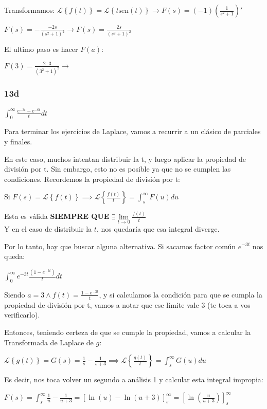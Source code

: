 \documentclass[11pt]{article}
\def\sen{\mathrm{sen}}
\newcommand{\lapl}[1]{\mathscr{L} \left\lbrace {#1} \right\rbrace}
\begin{document}
	Transformamos: $\displaystyle \lapl{f(t)}=\lapl{t\sen(t)} \rightarrow F(s)=(-1)\left(\frac{1}{s^2+1}\right)'$
	
	$\displaystyle F(s)=-\frac{-2s}{(s^2+1)^2}\rightarrow F(s)=\frac{2s}{(s^2+1)^2}$
	
	El ultimo paso es hacer $F(a)$:
	
	$\displaystyle F(3)=\frac{2\cdot3}{(3^2+1)^2} \rightarrow $ 
	
	\subsubsection{13d}	
	$\displaystyle \int_{0}^{\infty}\frac{e^{-3t}-e^{-6t}}{t}dt$
	
	Para terminar los ejercicios de Laplace, vamos a recurrir a un clásico de parciales y finales.
	
	En este caso, muchos intentan distribuir la t, y luego aplicar la propiedad de división por t. Sin embargo, esto no es posible ya que no se cumplen las condiciones. Recordemos la propiedad de división por t:
	
	Si $\displaystyle F(s)=\lapl{f(t)} \implies \lapl{\frac{f(t)}{t}}=\int_{s}^{\infty}F(u)du$
	
	Esta es válida \textbf{SIEMPRE QUE } $\displaystyle \exists \lim\limits_{t\rightarrow0}\frac{f(t)}{t}$\\
	Y en el caso de distribuir la $t$, nos quedaría que esa integral diverge.
	
	Por lo tanto, hay que buscar alguna alternativa. Si sacamos factor común $e^{-3t}$ nos queda:
	
	$\displaystyle \int_{0}^{\infty}e^{-3t}\frac{(1-e^{-3t})}{t}dt$
	
	Siendo $\displaystyle a=3 \wedge f(t)=\frac{1-e^{-3t}}{t}$, y si calculamos la condición para que se cumpla la propiedad de división por t, vamos a notar que ese límite vale 3 (te toca a vos verificarlo).
	
	Entonces, teniendo certeza de que se cumple la propiedad, vamos a calcular la Transformada de Laplace de $g$:
	
	$\displaystyle \lapl{g(t)}=G(s)=\frac{1}{s}-\frac{1}{s+3} \implies \lapl{\frac{g(t)}{t}}=\int_{s}^{\infty}G(u)du$
	
	Es decir, nos toca volver un segundo a análisis 1 y calcular esta integral impropia:
	
	$\displaystyle F(s)=\int_{s}^{\infty} \frac{1}{u}-\frac{1}{u+3}=\left[\ln(u)-\ln(u+3)\right]_{s}^{\infty}=\left[\ln\left(\frac{u}{u+3}\right)\right]_{s}^{\infty}$
	
\end{document}
